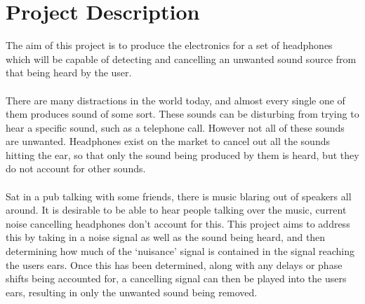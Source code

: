 \section{Project Description}
The aim of this project is to produce the electronics for a set of headphones which will be capable of detecting and cancelling an unwanted sound source from that being heard by the user.
\\
\\
There are many distractions in the world today, and almost every single one of them produces sound of some sort.
These sounds can be disturbing from trying to hear a specific sound, such as a telephone call.
However not all of these sounds are unwanted.
Headphones exist on the market to cancel out all the sounds hitting the ear, so that only the sound being produced by them is heard, but they do not account for other sounds.
\\
\\
Sat in a pub talking with some friends, there is music blaring out of speakers all around.
It is desirable to be able to hear people talking over the music, current noise cancelling headphones don't account for this.
This project aims to address this by taking in a noise signal as well as the sound being heard, and then determining how much of the `nuisance' signal is contained in the signal reaching the users ears.
Once this has been determined, along with any delays or phase shifts being accounted for, a cancelling signal can then be played into the users ears, resulting in only the unwanted sound being removed.
